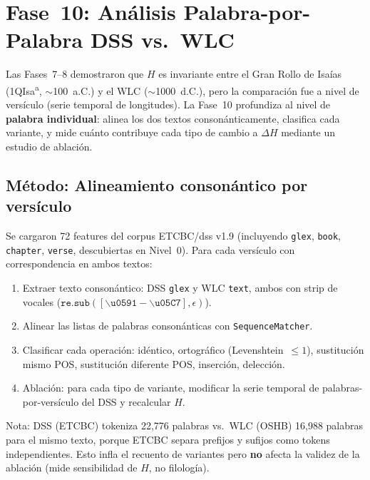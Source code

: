 \documentclass[12pt,a4paper]{article}
\begin{document}
\section{Fase~10: An\'alisis Palabra-por-Palabra DSS vs.\ WLC}

\noindent
Las Fases~7--8 demostraron que $H$ es invariante entre el Gran Rollo de Isa\'ias
(1QIsa\textsuperscript{a}, $\sim$100~a.C.) y el WLC ($\sim$1000~d.C.),
pero la comparaci\'on fue a nivel de vers\'iculo (serie temporal de longitudes).
La Fase~10 profundiza al nivel de \textbf{palabra individual}: alinea los dos textos
conson\'anticamente, clasifica cada variante, y mide cu\'anto contribuye
cada tipo de cambio a $\Delta H$ mediante un estudio de ablaci\'on.


\subsection{M\'etodo: Alineamiento conson\'antico por vers\'iculo}

Se cargaron 72 features del corpus ETCBC/dss v1.9 (incluyendo \texttt{glex},
\texttt{book}, \texttt{chapter}, \texttt{verse}, descubiertas en Nivel~0).
Para cada vers\'iculo con correspondencia en ambos textos:

\begin{enumerate}[leftmargin=2em]
\item Extraer texto conson\'antico: DSS \texttt{glex} y WLC \texttt{text},
      ambos con strip de vocales ($\texttt{re.sub}([\backslash\texttt{u0591}-\backslash\texttt{u05C7}], \epsilon)$).
\item Alinear las listas de palabras conson\'anticas con \texttt{SequenceMatcher}.
\item Clasificar cada operaci\'on: id\'entico, ortogr\'afico (Levenshtein~$\leq 1$),
      sustituci\'on mismo POS, sustituci\'on diferente POS, inserci\'on, delecci\'on.
\item Ablaci\'on: para cada tipo de variante, modificar la serie temporal de
      palabras-por-vers\'iculo del DSS y recalcular $H$.
\end{enumerate}

Nota: DSS (ETCBC) tokeniza 22,776 palabras vs.\ WLC (OSHB) 16,988 palabras
para el mismo texto, porque ETCBC separa prefijos y sufijos como tokens
independientes. Esto infla el recuento de variantes pero \textbf{no}
afecta la validez de la ablaci\'on (mide sensibilidad de $H$, no filolog\'ia).
\end{document}
